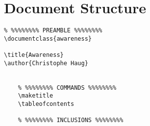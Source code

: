 \chapter{Document Structure}

\begin{LaTeXsource}
\begin{verbatim}
% %%%%%%%% PREAMBLE %%%%%%%%
\documentclass{awareness}

\title{Awareness}
\author{Christophe Haug}


    % %%%%%%%% COMMANDS %%%%%%%%
    \maketitle
    \tableofcontents

    % %%%%%%%% INCLUSIONS %%%%%%%%
    
    
    

\end{verbatim}
\end{LaTeXsource}
